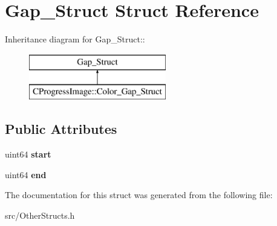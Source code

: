 \section{Gap\_\-Struct Struct Reference}
\label{structGap__Struct}
Inheritance diagram for Gap\_\-Struct::\begin{figure}[H]
\begin{center}
\leavevmode
\includegraphics[height=2cm]{structGap__Struct}
\end{center}
\end{figure}
\subsection*{Public Attributes}
\begin{DoxyCompactItemize}
\item 
uint64 {\bfseries start}\label{structGap__Struct_ae993f9df68ee60ee42984c5f53291932}

\item 
uint64 {\bfseries end}\label{structGap__Struct_afec19ac3b027218898fc02360335f5bb}

\end{DoxyCompactItemize}


The documentation for this struct was generated from the following file:\begin{DoxyCompactItemize}
\item 
src/OtherStructs.h\end{DoxyCompactItemize}
